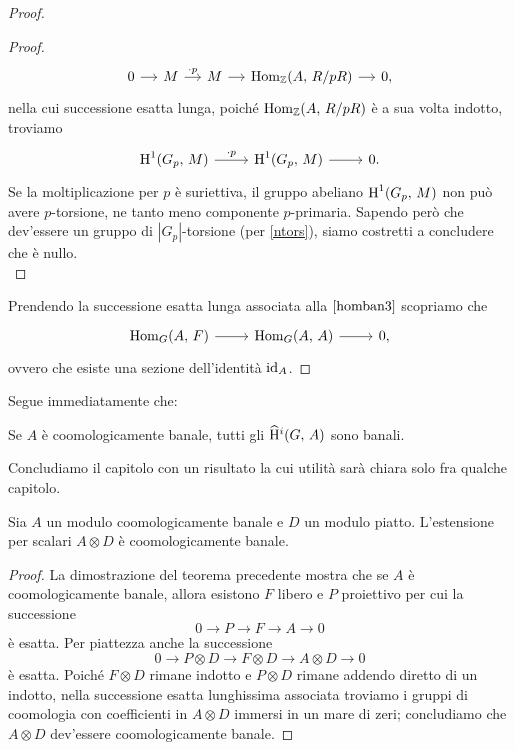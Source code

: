 \begin{proof}
\begin{proof}
		\begin{equation*}
		\begin{tikzcd}[column sep = small]
		0 \rar & M \rar["\cdot p"] & M \rar & \Hom_\Z(A, \, R/pR) \rar & 0,
		\end{tikzcd}
		\end{equation*}
		nella cui successione esatta lunga, poiché $ \operatorname{Hom}_{\mathbb{Z}}(A, \, R/pR) $ è a sua volta indotto, troviamo
		\[ \begin{tikzcd}
		\HH^1(G_p, \, M) \rar["\cdot p"] & \HH^1(G_p, \, M) \rar & 0.
		\end{tikzcd}  \]
		Se la moltiplicazione per $ p $ è suriettiva, il gruppo abeliano $ \operatorname{H}^1(G_p, \, M) $ non può avere $ p $-torsione, ne tanto meno componente $ p $-primaria. Sapendo però che dev'essere un gruppo di $ |G_p | $-torsione (per \ref{ntors}), siamo costretti a concludere che è nullo. \\
	\end{proof}
	Prendendo la successione esatta lunga associata alla $ \eqref{homban3} $ scopriamo che
	\[\begin{tikzcd}
	\Hom_G(A, \, F) \rar & \Hom_G(A, \, A) \rar & 0,
	\end{tikzcd} \]
	ovvero che esiste una sezione dell'identità $ \operatorname{id}_A $.
\end{proof}

Segue immediatamente che:

\begin{corollary}
	Se $ A $ è coomologicamente banale, tutti gli $ \operatorname{\widehat{H}^\mathnormal{i}}(G, \, A) $ sono banali.
\end{corollary}

Concludiamo il capitolo con un risultato la cui utilità sarà chiara solo fra qualche capitolo.

\begin{corollary}\label{tensor magic}
	Sia $ A $ un modulo coomologicamente banale e $ D $ un modulo piatto. L'estensione per scalari $ A \otimes D $ è coomologicamente banale.
\end{corollary}
\begin{proof}
	La dimostrazione del teorema precedente mostra che se $ A $ è coomologicamente banale, allora esistono $ F $ libero e $ P $ proiettivo per cui la successione
	\[ 0 \to P \to F \to A \to 0 \]
	è esatta. Per piattezza anche la successione
	\[ 0 \to P \otimes D \to F\otimes D \to A\otimes D \to 0 \]
	è esatta. Poiché $ F \otimes D $ rimane indotto e $ P \otimes D $ rimane addendo diretto di un indotto, nella successione esatta lunghissima associata troviamo i gruppi di coomologia con coefficienti in $ A \otimes D $ immersi in un mare di zeri; concludiamo che $ A \otimes D $ dev'essere coomologicamente banale.
\end{proof}

